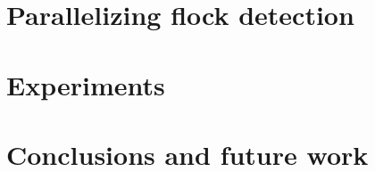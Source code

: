 \documentclass[12pt]{scrartcl}
\begin{document}
\section{Parallelizing flock detection}\label{sec:flock}
% 



\section{Experiments}\label{sec:experiments}
% 


\section{Conclusions and future work}\label{sec:conclusions}




\end{document}
